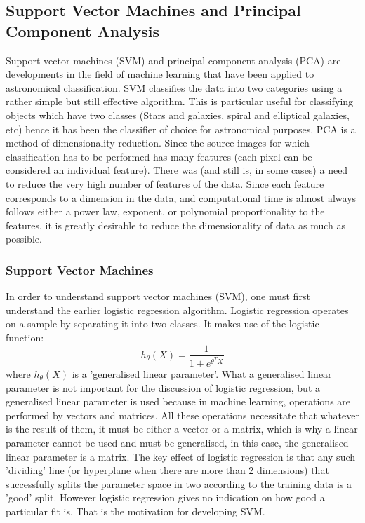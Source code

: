 \documentclass[a4paper,11pt]{article}
\begin{document}
\subsection{Support Vector Machines and Principal Component Analysis}
Support vector machines (SVM) and principal component analysis (PCA) are developments in the field of machine learning that have been applied to astronomical classification. SVM classifies the data into two categories using a rather simple but still effective algorithm. This is particular useful for classifying objects which have two classes (Stars and galaxies, spiral and elliptical galaxies, etc) hence it has been the classifier of choice for astronomical purposes. PCA is a method of dimensionality reduction. Since the source images for which classification has to be performed has many features (each pixel can be considered an individual feature). There was (and still is, in some cases) a need to reduce the very high number of features of the data. Since each feature corresponds to a dimension in the data, and computational time is almost always follows either a power law, exponent, or polynomial proportionality to the features, it is greatly desirable to reduce the dimensionality of data as much as possible.
\subsubsection{Support Vector Machines}
In order to understand support vector machines (SVM), one must first understand the earlier logistic regression algorithm. Logistic regression operates on a sample by separating it into two classes. It makes use of the logistic function:
\begin{equation}
h_{\theta}(X)=\frac{1}{1+e^{\theta^{T}X}}
\end{equation}
where $h_\theta (X)$ is a 'generalised linear parameter'. What a generalised linear parameter is not important for the discussion of logistic regression, but a generalised linear parameter is used because in machine learning, operations are performed by vectors and matrices. All these operations necessitate that whatever is the result of them, it must be either a vector or a matrix, which is why a linear parameter cannot be used and must be generalised, in this case, the generalised linear parameter is a matrix. The key effect of logistic regression is that any such 'dividing' line (or hyperplane when there are more than 2 dimensions) that successfully splits the parameter space in two according to the training data is a 'good' split. However logistic regression gives no indication on how good a particular fit is. That is the motivation for developing SVM.
\end{document}
